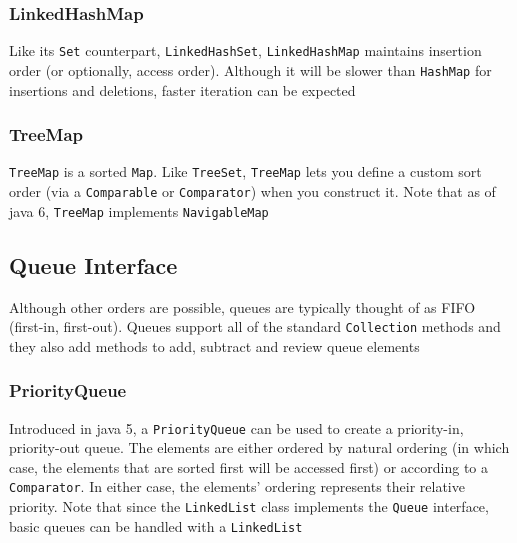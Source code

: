 \subsubsection{LinkedHashMap}
Like its \verb#Set# counterpart, \verb#LinkedHashSet#, \verb#LinkedHashMap# 
maintains insertion order (or optionally, access order). Although it will be 
slower than \verb#HashMap# for insertions and deletions, faster iteration can 
be expected

\subsubsection{TreeMap}
\verb#TreeMap# is a sorted \verb#Map#. Like \verb#TreeSet#, \verb#TreeMap# lets 
you define a custom sort order (via a \verb#Comparable# or \verb#Comparator#) 
when you construct it. Note that as of java 6, \verb#TreeMap# implements 
\verb#NavigableMap#

\subsection{Queue Interface}
Although other orders are possible, queues are typically thought of as FIFO 
(first-in, first-out). Queues support all of the standard \verb#Collection# 
methods and they also add methods to add, subtract and review queue elements

\subsubsection{PriorityQueue}
Introduced in java 5, a \verb#PriorityQueue# can be used to create a 
priority-in, priority-out queue. The elements are either ordered by natural 
ordering (in which case, the elements that are sorted first will be accessed 
first) or according to a \verb#Comparator#. In either case, the elements' 
ordering represents their relative priority. Note that since the 
\verb#LinkedList# class implements the \verb#Queue# interface, basic queues can 
be handled with a \verb#LinkedList#

